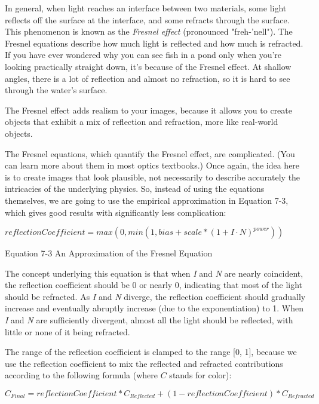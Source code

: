 \documentclass[../main.tex]{subfiles}
\begin{document}
In general, when light reaches an interface between two materials, some light reflects off the surface at the interface, and some refracts through the surface. This phenomenon is known as the \textit{Fresnel effect} (pronounced "freh-'nell"). The Fresnel equations describe how much light is reflected and how much is refracted. If you have ever wondered why you can see fish in a pond only when you're looking practically straight down, it's because of the Fresnel effect. At shallow angles, there is a lot of reflection and almost no refraction, so it is hard to see through the water's surface.

The Fresnel effect adds realism to your images, because it allows you to create objects that exhibit a mix of reflection and refraction, more like real-world objects.

The Fresnel equations, which quantify the Fresnel effect, are complicated. (You can learn more about them in most optics textbooks.) Once again, the idea here is to create images that look plausible, not necessarily to describe accurately the intricacies of the underlying physics. So, instead of using the equations themselves, we are going to use the empirical approximation in Equation 7-3, which gives good results with significantly less complication:

\FloatBarrier
\begin{equationcaption}
$
reflectionCoefficient = max(0,min(1,bias+scale*(1+I \cdot N)^{power}))
$
\caption{Equation 7-3 An Approximation of the Fresnel Equation}
\end{equationcaption}
\FloatBarrier

The concept underlying this equation is that when \textit{I} and \textit{N} are nearly coincident, the reflection coefficient should be 0 or nearly 0, indicating that most of the light should be refracted. As \textit{I} and \textit{N} diverge, the reflection coefficient should gradually increase and eventually abruptly increase (due to the exponentiation) to 1. When \textit{I} and \textit{N} are sufficiently divergent, almost all the light should be reflected, with little or none of it being refracted.

The range of the reflection coefficient is clamped to the range [0, 1], because we use the reflection coefficient to mix the reflected and refracted contributions according to the following formula (where $C$ stands for color):

$C_{Final} = reflectionCoefficient * C_{Reflected} + (1 - reflectionCoefficient) * C_{Refracted}$
\end{document}
